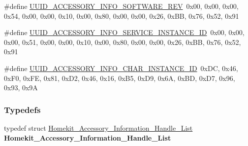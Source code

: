 \begin{DoxyCompactItemize}
\item 
\#define \hyperlink{group___h_a_i_s_ga8f9472fc1f924010ccb0c497754c8cc7}{U\+U\+I\+D\+\_\+\+A\+C\+C\+E\+S\+S\+O\+R\+Y\+\_\+\+I\+N\+F\+O\+\_\+\+S\+O\+F\+T\+W\+A\+R\+E\+\_\+\+R\+EV}~0x00, 0x00, 0x00, 0x54, 0x00, 0x00, 0x10, 0x00, 0x80, 0x00, 0x00, 0x26, 0x\+B\+B, 0x76, 0x52, 0x91
\item 
\#define \hyperlink{group___h_a_i_s_ga437682334cf7d0a470746ff630b0ae22}{U\+U\+I\+D\+\_\+\+A\+C\+C\+E\+S\+S\+O\+R\+Y\+\_\+\+I\+N\+F\+O\+\_\+\+S\+E\+R\+V\+I\+C\+E\+\_\+\+I\+N\+S\+T\+A\+N\+C\+E\+\_\+\+ID}~0x00, 0x00, 0x00, 0x51, 0x00, 0x00, 0x10, 0x00, 0x80, 0x00, 0x00, 0x26, 0x\+B\+B, 0x76, 0x52, 0x91
\item 
\#define \hyperlink{group___h_a_i_s_ga7fadb9746413cd09fcac437d2415e8cc}{U\+U\+I\+D\+\_\+\+A\+C\+C\+E\+S\+S\+O\+R\+Y\+\_\+\+I\+N\+F\+O\+\_\+\+C\+H\+A\+R\+\_\+\+I\+N\+S\+T\+A\+N\+C\+E\+\_\+\+ID}~0x\+D\+C, 0x46, 0x\+F0, 0x\+F\+E, 0x81, 0x\+D2, 0x46, 0x16, 0x\+B5, 0x\+D9, 0x6\+A, 0x\+B\+D, 0x\+D7, 0x96, 0x93, 0x9A
\end{DoxyCompactItemize}
\subsubsection*{Typedefs}
\begin{DoxyCompactItemize}
\item 
typedef struct \hyperlink{struct_homekit___accessory___information___handle___list}{Homekit\+\_\+\+Accessory\+\_\+\+Information\+\_\+\+Handle\+\_\+\+List} {\bfseries Homekit\+\_\+\+Accessory\+\_\+\+Information\+\_\+\+Handle\+\_\+\+List}\hypertarget{group___h_a_i_s_gad5ca6e6d34620fde58be78ac16f90031}{}\label{group___h_a_i_s_gad5ca6e6d34620fde58be78ac16f90031}

\end{DoxyCompactItemize}
